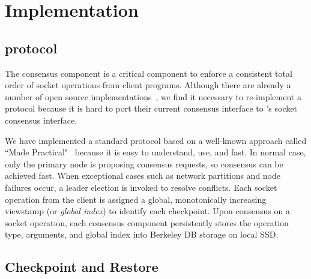 \section{Implementation} \label{sec:impl}


\subsection{\paxos protocol} \label{sec:paxos}
The \paxos consensus component is a critical component to enforce a consistent 
total order of socket operations from client programs. Although there are 
already a number of open source \paxos implementations~\cite{concoord, 
zookeeper, chubby:osdi, libpaxos}, we find it necessary to re-implement a 
\paxos protocol because it is hard to port their current consensus 
interface to \xxx's socket consensus interface.


We have implemented a standard \paxos protocol based on a well-known approach 
called ``\paxos Made Practical"~\cite{paxos:practical} because it is easy to 
understand, use, and fast. In normal case, only the primary node is proposing 
consensus requests, so consensus can be achieved fast. When exceptional cases 
such as network partitions and node failures occur, a \paxos leader election is 
invoked to resolve conflicts. Each socket operation from the client is assigned 
a global, monotonically increasing viewstamp (or \emph{global index}) to 
identify each checkpoint. Upon consensus on a socket operation, each consensus 
component persistently stores the operation type, arguments, and global index 
into Berkeley DB storage on local SSD.



\subsection{Checkpoint and Restore} \label{sec:checkpoint}


